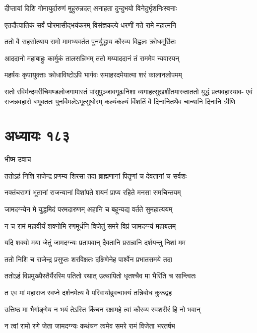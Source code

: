 \twolineshloka
{दीप्तायां दिशि गोमायुर्दारुणं मुहुरुन्नदत्}
{अनाहता दुन्दुभयो विनेदुर्भृशनिःस्वनाः}


\twolineshloka
{एतदौत्पातिकं सर्वं घोरमासीद्भयंकरम्}
{विसंज्ञकल्पे धरणीं गते रामे महात्मनि}


\twolineshloka
{ततो वै सहसोत्थाय रामो मामभ्यवर्तत}
{पुनर्युद्धाय कौरव्य विह्वलः क्रोधमूर्छितः}


\twolineshloka
{आददानो महाबाहुः कार्मुकं तालसन्निभम्}
{ततो मय्याददानं तं राममेव न्यवारयन्}


\twolineshloka
{महर्षयः कृपायुक्ताः क्रोधाविष्टोऽपि भार्गवः}
{समाहरदमेयात्मा शरं कालानलोपमम्}


सतो रविर्मन्दमरीचिमण्डलोजगामास्तं पांसुपुञ्जावगूढःनिशा व्यगाहत्सुखशीतमारुताततो युद्धं प्रत्यवहारयाव-
\twolineshloka
{एवं राजन्नवहारो बभूवततः पुनर्विमलेऽभूत्सुघोरम्}
{कल्यंकल्यं विंशतिं वै दिनानितथैव चान्यानि दिनानि त्रीणि}


\chapter{अध्यायः १८३}
\twolineshloka
{भीष्म उवाच}
{}


\twolineshloka
{ततोऽहं निशि राजेन्द्र प्रणम्य शिरसा तदा}
{ब्राह्मणानां पितॄणां च देवतानां च सर्वशः}


\twolineshloka
{नक्तंचराणां भूतानां राजन्यानां विशांपते}
{शयनं प्राप्य रहिते मनसा समचिन्तयम्}


\twolineshloka
{जामदग्न्येन मे युद्धमिदं परमदारुणम्}
{अहानि च बहून्यद्य वर्तते सुमहात्ययम्}


\twolineshloka
{न च रामं महावीर्यं शक्नोमि रणमूर्धनि}
{विजेतुं समरे विप्रं जामदग्न्यं महाबलम्}


\twolineshloka
{यदि शक्यो मया जेतुं जामदग्न्यः प्रतापवान्}
{दैवतानि प्रसन्नानि दर्शयन्तु निशां मम}


\twolineshloka
{ततो निशि च राजेन्द्र प्रसुप्तः शरविक्षतः}
{दक्षिणेनेह पार्श्वेन प्रभातसमये तदा}


\twolineshloka
{ततोऽहं विप्रमुख्यैस्तैर्यैरस्मि पतितो रथात्}
{उत्थापितो धृतश्चैव मा भैरिति च सान्त्वितः}


\twolineshloka
{त एव मां महाराज स्वप्ने दर्शनमेत्य वै}
{परिवार्याब्रुवन्वाक्यं तन्निबोध कुरूद्वह}


\twolineshloka
{उत्तिष्ठ मा भैर्गाङ्गेय न भयं तेऽस्ति किंचन}
{रक्षामहे त्वां कौरव्य स्वशरीरं हि नो भवान्}


\twolineshloka
{न त्वां रामो रणे जेता जामदग्न्यः कथंचन}
{त्वमेव समरे रामं विजेता भरतर्षभ}


